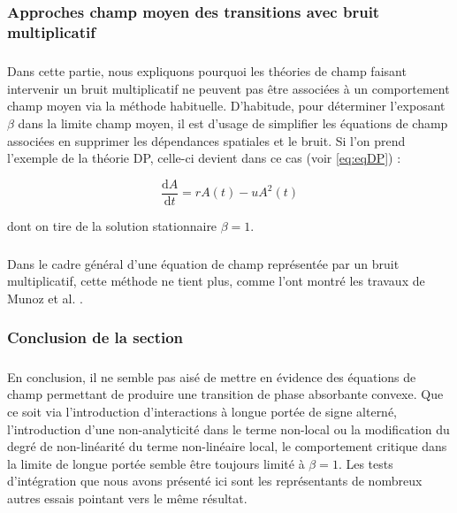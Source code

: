 \subsubsection{Approches champ moyen des transitions avec bruit multiplicatif}

\subparagraph{}Dans cette partie, nous expliquons pourquoi les théories de champ faisant intervenir un bruit multiplicatif ne peuvent pas être associées à un comportement champ moyen via la méthode habituelle. D'habitude, pour déterminer l'exposant $\beta$ dans la limite champ moyen, il est d'usage de simplifier les équations de champ associées en supprimer les dépendances spatiales et le bruit. Si l'on prend l'exemple de la théorie DP, celle-ci devient dans ce cas (voir \autoref{eq:eqDP}) :

\begin{equation}
	\frac{\mathrm{d}A}{\mathrm{d}t} = rA(t) - u A^2(t)
\end{equation}

\noindent dont on tire de la solution stationnaire $\beta = 1$.

\subparagraph{}Dans le cadre général d'une équation de champ représentée par un bruit multiplicatif, cette méthode ne tient plus, comme l'ont montré les travaux de Munoz et al. \cite{munoz_multiplicative_2003, munoz_multiplicative_2003}. 

\subsubsection{Conclusion de la section}

\subparagraph{}En conclusion, il ne semble pas aisé de mettre en évidence des équations de champ permettant de produire une transition de phase absorbante convexe. Que ce soit via l'introduction d'interactions à longue portée de signe alterné, l'introduction d'une non-analyticité dans le terme non-local ou la modification du degré de non-linéarité du terme non-linéaire local, le comportement critique dans la limite de longue portée semble être toujours limité à $\beta = 1$. Les tests d'intégration que nous avons présenté ici sont les représentants de nombreux autres essais pointant vers le même résultat. 

